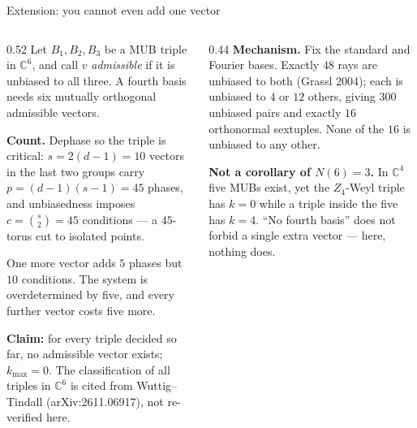 \documentclass[aspectratio=169,10pt]{beamer}
\newcommand{\C}{\mathbb{C}}
\begin{document}
\begin{frame}{Extension: you cannot even add one vector}
  \begin{columns}[T]
  \begin{column}{0.52\textwidth}
    \small
    Let $B_1,B_2,B_3$ be a MUB triple in $\C^6$, and call $v$ \emph{admissible} if it is unbiased to
    all three. A fourth basis needs six mutually orthogonal admissible vectors.
    \medskip

    \textbf{Count.} Dephase so the triple is critical: $s=2(d-1)=10$ vectors in the last two groups
    carry $p=(d-1)(s-1)=45$ phases, and unbiasedness imposes $c=\binom{s}{2}=45$ conditions ---
    a $45$-torus cut to isolated points.
    \medskip

    One more vector adds $5$ phases but $10$ conditions. The system is overdetermined by five,
    and every further vector costs five more.
    \medskip

    {\color{acc}\textbf{Claim:} for every triple decided so far, no admissible vector exists;
    $k_{\max}=0$. The classification of all triples in $\C^6$ is cited from Wuttig--Tindall
    (arXiv:2611.06917), not re-verified here.}
  \end{column}
  \begin{column}{0.44\textwidth}
    \small
    \textbf{Mechanism.} Fix the standard and Fourier bases. Exactly $48$ rays are unbiased to both
    (Grassl 2004); each is unbiased to $4$ or $12$ others, giving $300$ unbiased pairs and exactly
    $16$ orthonormal sextuples. None of the $16$ is unbiased to any other.
    \medskip

    \textbf{Not a corollary of $N(6)=3$.} In $\C^4$ five MUBs exist, yet the $Z_4$-Weyl triple has
    $k=0$ while a triple inside the five has $k=4$. ``No fourth basis'' does not forbid a single
    extra vector --- here, nothing does.
  \end{column}
  \end{columns}
\end{frame}
\end{document}
